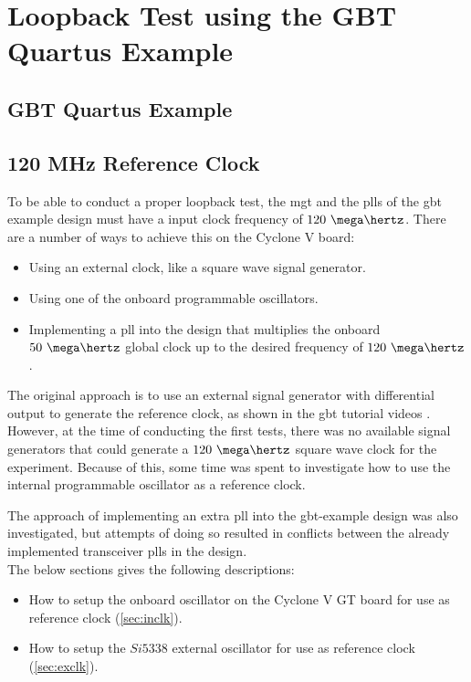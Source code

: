 \documentclass[main.tex]{subfiles}
\begin{document}
\chapter{Loopback Test using the GBT Quartus Example}

\section{GBT Quartus Example}


\section{120 MHz Reference Clock}


To be able to conduct a proper loopback test, the \gls{mgt} and the \glspl{pll} of the \gls{gbt} example design must have a input clock frequency of $120~\mega\hertz$. There are a number of ways to achieve this on the Cyclone V board: 
\begin{itemize}\setlength{\itemsep}{10pt}
\item Using an external clock, like a square wave signal generator.
\item Using one of the onboard programmable oscillators.
\item Implementing a \gls{pll} into the design that multiplies the onboard $50~\mega\hertz$ global clock up to the desired frequency of $120~\mega\hertz$.\\
\end{itemize}

The original approach is to use an external signal generator with differential output to generate the reference clock, as shown in the \gls{gbt} tutorial videos \cite{gbt_videos}. However, at the time of conducting the first tests, there was no available signal generators that could generate a $120~\mega\hertz$ square wave clock for the experiment. Because of this, some time was spent to investigate how to use the internal programmable oscillator as a reference clock.

The approach of implementing an extra \gls{pll} into the \gls{gbt}-example design was also investigated, but attempts of doing so resulted in conflicts between the already implemented transceiver \glspl{pll} in the design. \\

The below sections gives the following descriptions:
\begin{itemize}\setlength{\itemsep}{10pt}
\item How to setup the onboard oscillator on the Cyclone V GT board for use as reference clock (\ref{sec:inclk}). 
\item How to setup the $Si5338$ external oscillator for use as reference clock (\ref{sec:exclk}).
\end{itemize}
\end{document}
